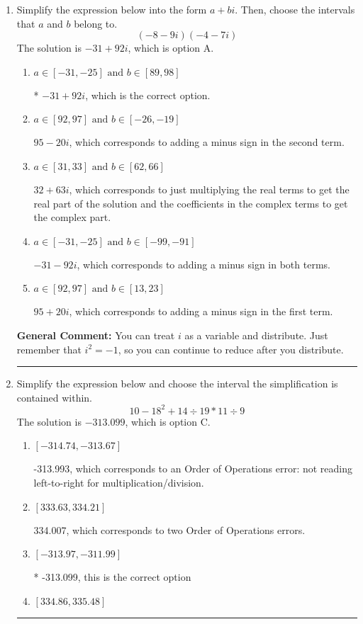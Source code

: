 \documentclass{extbook}[14pt]
\newcommand{\litem}[1]{\item #1

\rule{\textwidth}{0.4pt}}
\begin{document}
\begin{enumerate}\litem{
Simplify the expression below into the form $a+bi$. Then, choose the intervals that $a$ and $b$ belong to.
\[ (-8 - 9 i)(-4 - 7 i) \]
The solution is \( -31 + 92 i \), which is option A.\begin{enumerate}[label=\Alph*.]
\item \( a \in [-31, -25] \text{ and } b \in [89, 98] \)

* $-31 + 92 i$, which is the correct option.
\item \( a \in [92, 97] \text{ and } b \in [-26, -19] \)

 $95 - 20 i$, which corresponds to adding a minus sign in the second term.
\item \( a \in [31, 33] \text{ and } b \in [62, 66] \)

 $32 + 63 i$, which corresponds to just multiplying the real terms to get the real part of the solution and the coefficients in the complex terms to get the complex part.
\item \( a \in [-31, -25] \text{ and } b \in [-99, -91] \)

 $-31 - 92 i$, which corresponds to adding a minus sign in both terms.
\item \( a \in [92, 97] \text{ and } b \in [13, 23] \)

 $95 + 20 i$, which corresponds to adding a minus sign in the first term.
\end{enumerate}

\textbf{General Comment:} You can treat $i$ as a variable and distribute. Just remember that $i^2=-1$, so you can continue to reduce after you distribute.
}
\litem{
Simplify the expression below and choose the interval the simplification is contained within.
\[ 10 - 18^2 + 14 \div 19 * 11 \div 9 \]
The solution is \( -313.099 \), which is option C.\begin{enumerate}[label=\Alph*.]
\item \( [-314.74, -313.67] \)

 -313.993, which corresponds to an Order of Operations error: not reading left-to-right for multiplication/division.
\item \( [333.63, 334.21] \)

 334.007, which corresponds to two Order of Operations errors.
\item \( [-313.97, -311.99] \)

* -313.099, this is the correct option
\item \( [334.86, 335.48] \)


\end{enumerate}}
\end{enumerate}
\end{document}
